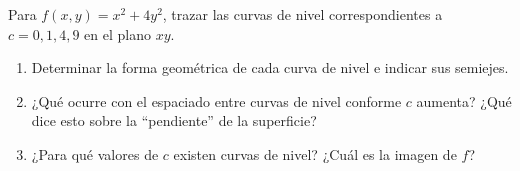 Para $f(x,y) = x^2 + 4y^2$, trazar las curvas de nivel correspondientes a $c = 0, 1, 4, 9$ en el plano $xy$.
\begin{enumerate}
    \item Determinar la forma geométrica de cada curva de nivel e indicar sus semiejes.
    \item ¿Qué ocurre con el espaciado entre curvas de nivel conforme $c$ aumenta? ¿Qué dice esto sobre la ``pendiente'' de la superficie?
    \item ¿Para qué valores de $c$ existen curvas de nivel? ¿Cuál es la imagen de $f$?
\end{enumerate}